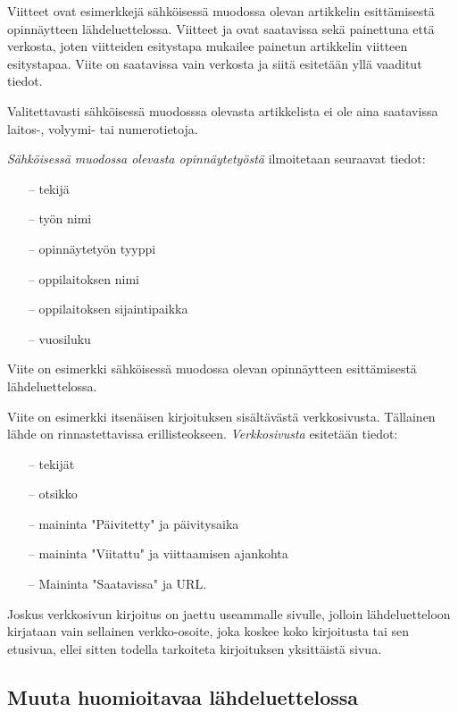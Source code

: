 \documentclass[english, 12pt, a4paper, sci, utf8, a-1b, online]{aaltothesis}
\begin{document}
Viitteet \citep{Ribeiro,Stieber,kone} ovat esimerkkejä sähköisessä
muodossa olevan artikkelin esittämisestä opinnäytteen
lähdeluettelossa.  Viitteet \citep{Ribeiro} ja \citep{Stieber} ovat
saatavissa sekä painettuna että verkosta, joten viitteiden esitystapa
mukailee painetun artikkelin viitteen esitystapaa. Viite \citep{kone} on
saatavissa vain verkosta ja siitä esitetään yllä vaaditut tiedot.

Valitettavasti sähköisessä muodosssa olevasta artikkelista ei ole aina 
saatavissa lai\-tos-, volyymi- tai numerotietoja.

\textit{Sähköisessä muodossa olevasta opinnäytetyöstä} ilmoitetaan
seuraavat tiedot:
 
\begin{itemize}
\item[--]tekijä
\item[--]työn nimi
\item[--]opinnäytetyön tyyppi
\item[--]oppilaitoksen nimi
\item[--]oppilaitoksen sijaintipaikka
\item[--]vuosiluku

\end{itemize}

Viite \citep{Adida} on esimerkki sähköisessä muodossa olevan
opinnäytteen esittämisestä lähdeluettelossa.

Viite \citep{viittaaminen} on esimerkki itsenäisen kirjoituksen sisältävästä
verkkosivusta. Tällainen lähde on rinnastettavissa erillisteokseen.
\textit{Verkkosivusta} esitetään tiedot:

\begin{itemize}
\item[--] tekijät
\item[--] otsikko
\item[--] maininta "Päivitetty" ja päivitysaika 
\item[--] maininta "Viitattu" ja viittaamisen ajankohta
\item[--] Maininta "Saatavissa" ja URL.
\end{itemize}

Joskus verkkosivun kirjoitus on jaettu useammalle sivulle, jolloin
lähdeluetteloon kirjataan vain sellainen verkko-osoite, joka koskee
koko kirjoitusta tai sen etusivua, ellei sitten 
todella tarkoiteta kirjoituksen yksittäistä sivua. 

\subsection{Muuta huomioitavaa lähdeluettelossa}
\end{document}
